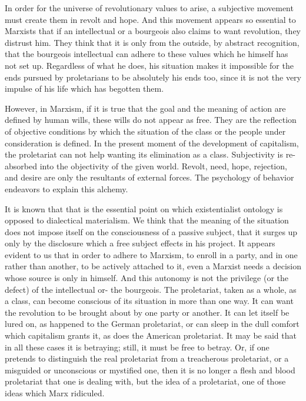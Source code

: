 \documentclass[11pt]{article}
\begin{document}
In order for the universe of revolutionary values to arise, a subjective movement must create them in revolt and hope. And this movement appears so essential to Marxists that if an intellectual or a bourgeois also claims to want revolution, they distrust him. They think that it is only from the outside, by abstract recognition, that the bourgeois intellectual can adhere to these values which he himself has not set up. Regardless of what he does, his situation makes it impossible for the ends pursued by proletarians to be absolutely his ends too, since it is not the very impulse of his life which has begotten them.

However, in Marxism, if it is true that the goal and the meaning of action are defined by human wills, these wills do not appear as free. They are the reflection of objective conditions by which the situation of the class or the people under consideration is defined. In the present moment of the development of capitalism, the proletariat can not help wanting its elimination as a class. Subjectivity is re-absorbed into the objectivity of the given world. Revolt, need, hope, rejection, and desire are only the resultants of external forces. The psychology of behavior endeavors to explain this alchemy.

It is known that that is the essential point on which existentialist ontology is opposed to dialectical materialism. We think that the meaning of the situation does not impose itself on the consciousness of a passive subject, that it surges up only by the disclosure which a free subject effects in his project. It appears evident to us that in order to adhere to Marxism, to enroll in a party, and in one rather than another, to be actively attached to it, even a Marxist needs a decision whose source is only in himself. And this autonomy is not the privilege (or the defect) of the intellectual or- the bourgeois. The proletariat, taken as a whole, as a class, can become conscious of its situation in more than one way. It can want the revolution to be brought about by one party or another. It can let itself be lured on, as happened to the German proletariat, or can sleep in the dull comfort which capitalism grants it, as does the American proletariat. It may be said that in all these cases it is betraying; still, it must be free to betray. Or, if one pretends to distinguish the real proletariat from a treacherous proletariat, or a misguided or unconscious or mystified one, then it is no longer a flesh and blood proletariat that one is dealing with, but the idea of a proletariat, one of those ideas which Marx ridiculed.
\end{document}

